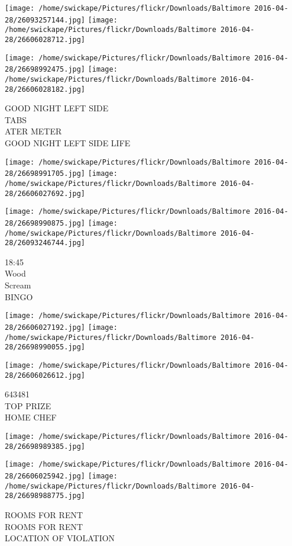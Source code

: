\documentclass[10pt,letterpaper]{article}
\begin{document}
\texttt{[image: /home/swickape/Pictures/flickr/Downloads/Baltimore 2016-04-28/26093257144.jpg]}
\texttt{[image: /home/swickape/Pictures/flickr/Downloads/Baltimore 2016-04-28/26606028712.jpg]}

\texttt{[image: /home/swickape/Pictures/flickr/Downloads/Baltimore 2016-04-28/26698992475.jpg]}
\texttt{[image: /home/swickape/Pictures/flickr/Downloads/Baltimore 2016-04-28/26606028182.jpg]}

GOOD NIGHT LEFT SIDE\\
TABS\\
ATER METER\\
GOOD NIGHT LEFT SIDE LIFE
\pagebreak

\texttt{[image: /home/swickape/Pictures/flickr/Downloads/Baltimore 2016-04-28/26698991705.jpg]}
\texttt{[image: /home/swickape/Pictures/flickr/Downloads/Baltimore 2016-04-28/26606027692.jpg]}

\texttt{[image: /home/swickape/Pictures/flickr/Downloads/Baltimore 2016-04-28/26698990875.jpg]}
\texttt{[image: /home/swickape/Pictures/flickr/Downloads/Baltimore 2016-04-28/26093246744.jpg]}

18:45\\
Wood\\
Scream\\
BINGO
\pagebreak

\texttt{[image: /home/swickape/Pictures/flickr/Downloads/Baltimore 2016-04-28/26606027192.jpg]}
\texttt{[image: /home/swickape/Pictures/flickr/Downloads/Baltimore 2016-04-28/26698990055.jpg]}

\texttt{[image: /home/swickape/Pictures/flickr/Downloads/Baltimore 2016-04-28/26606026612.jpg]}

643481\\
TOP PRIZE\\
HOME CHEF
\pagebreak

\texttt{[image: /home/swickape/Pictures/flickr/Downloads/Baltimore 2016-04-28/26698989385.jpg]}

\vspace{0.25in}
\texttt{[image: /home/swickape/Pictures/flickr/Downloads/Baltimore 2016-04-28/26606025942.jpg]}
\texttt{[image: /home/swickape/Pictures/flickr/Downloads/Baltimore 2016-04-28/26698988775.jpg]}

ROOMS FOR RENT\\
ROOMS FOR RENT\\
LOCATION OF VIOLATION
\pagebreak
\end{document}
